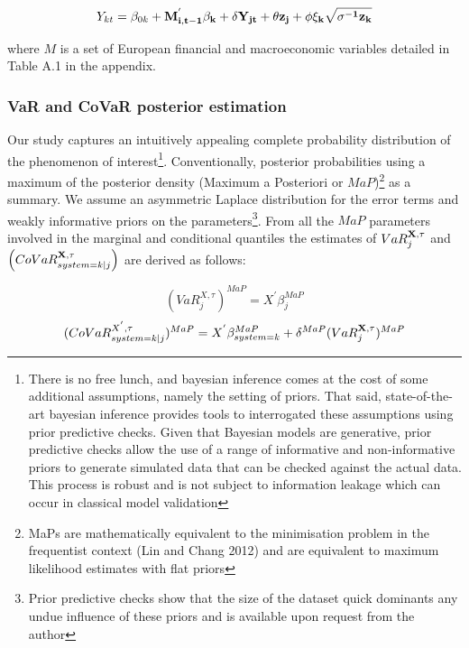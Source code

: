 \documentclass[
  10pt,
]{article}
\begin{document}
\begin{equation}\label{eq:eq5}
Y_{kt}=\beta_{0k}+\bf{M^{'}_{i,t-1}} \bf{\beta_k} +\delta Y_{jt}+\theta z_j+\phi\xi_k\sqrt{\sigma^{-1}z_k}
\end{equation}

where \(M\) is a set of European financial and macroeconomic variables
detailed in Table A.1 in the appendix.

\hypertarget{var-and-covar-posterior-estimation}{%
\subsubsection{VaR and CoVaR posterior
estimation}\label{var-and-covar-posterior-estimation}}

Our study captures an intuitively appealing complete probability
distribution of the phenomenon of interest\footnote{There is no free
  lunch, and bayesian inference comes at the cost of some additional
  assumptions, namely the setting of priors. That said, state-of-the-art
  bayesian inference provides tools to interrogated these assumptions
  using prior predictive checks. Given that Bayesian models are
  generative, prior predictive checks allow the use of a range of
  informative and non-informative priors to generate simulated data that
  can be checked against the actual data. This process is robust and is
  not subject to information leakage which can occur in classical model
  validation}. Conventionally, posterior probabilities using a maximum
of the posterior density (Maximum a Posteriori or \(MaP\))\footnote{MaPs
  are mathematically equivalent to the minimisation problem in the
  frequentist context (Lin and Chang 2012) and are equivalent to maximum
  likelihood estimates with flat priors} as a summary. We assume an
asymmetric Laplace distribution for the error terms and weakly
informative priors on the parameters\footnote{Prior predictive checks
  show that the size of the dataset quick dominants any undue influence
  of these priors and is available upon request from the author}. From
all the \(MaP\) parameters involved in the marginal and conditional
quantiles the estimates of \(VaR^{\bf{X},\tau}_j\) and
\(\left( CoVaR_{system=k|j}^{\bf{X},\tau} \right)\) are derived as
follows:

\begin{equation}\label{eq:eq6}
(VaR^{X,\tau}_j)^{MaP} = X^{'}\beta_j^{MaP}
\end{equation} \begin{equation}\label{eq:eq7}
(CoVaR_{system=k|j}^{X^{'},\tau})^{MaP} = X^{'} \beta_{system=k}^{MaP}+\delta^{MaP}(VaR^{\bf{X},\tau}_j)^{MaP}
\end{equation}
\end{document}
